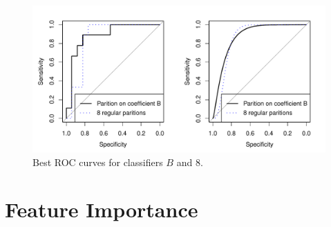 \begin{figure}[!htbp]
  \begin{center}
  \includegraphics[width = \textwidth, keepaspectratio]{./figs/eegroc-comb.pdf}
  \end{center}
  \caption{Best ROC curves for classifiers $B$ and $8$.}
\end{figure}
\label{fig:eegroc} 




\section{Feature Importance}


